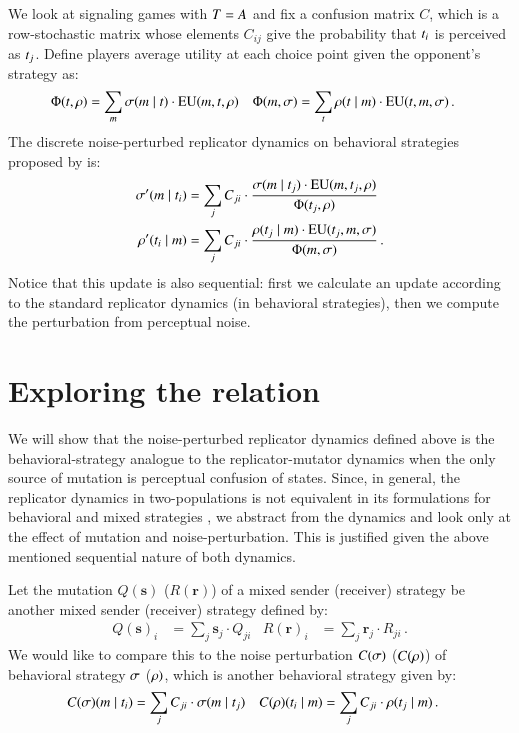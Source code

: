 \documentclass[fleqn,reqno,10pt]{article}
\renewcommand{\Smixed}{\ensuremath{\mathrm{\mathbf{s}}}}
\renewcommand{\Rmixed}{\ensuremath{\mathrm{\mathbf{r}}}}
\begin{document}
We look at signaling games with $T = A$ and fix a confusion
matrix $C$, which is a row-stochastic matrix whose elements $C_{ij}$
give the probability that $t_i$ is perceived as
$t_j$. Define players average utility at each choice point given
the opponent's strategy as:
\begin{align*}
  \Phi(t,\rho) & = \sum_{m} \sigma(m \mid t) \cdot
\mathrm{EU}(m,t,\rho) &
\Phi(m,\sigma) & = \sum_{t} \rho(t \mid m)
\cdot \mathrm{EU}(t,m,\sigma)\,.
\end{align*}
The discrete noise-perturbed replicator dynamics on behavioral
strategies proposed by \citet{Correia2013:The-Bivalent-Tr} is:
\begin{align*}
  \sigma'(m \mid t_i) & = \sum_{j} C_{ji} \cdot
  \frac{\sigma(m \mid t_j) \cdot
    \mathrm{EU}(m,t_j,\rho)} {\Phi(t_j,\rho)} \\
    \rho'(t_i \mid m) & = \sum_{j} C_{ji} \cdot
  \frac{\rho(t_j \mid m) \cdot
    \mathrm{EU}(t_j,m,\sigma)} {\Phi(m,\sigma)}  \,.
\end{align*}
Notice that this update is also sequential: first we calculate an
update according to the standard replicator dynamics (in behavioral
strategies), then we compute the perturbation from perceptual noise.


\section{Exploring the relation}

We will show that the noise-perturbed replicator dynamics defined
above is the behavioral-strategy analogue to the replicator-mutator
dynamics when the only source of mutation is perceptual confusion of
states. Since, in general, the replicator dynamics in two-populations
is not equivalent in its formulations for behavioral and mixed
strategies \citep{Cressman2003:Evolutionary-Dy}, we abstract from the
dynamics and look only at the effect of mutation and
noise-perturbation. This is justified given the above mentioned
sequential nature of both dynamics.

Let the mutation $Q(\Smixed)$ ($R(\Rmixed)$) of a mixed sender
(receiver) strategy be another mixed sender (receiver) strategy
defined by:
\begin{align*}
  Q(\Smixed)_i & =  \sum_j  \Smixed_j \cdot
  Q_{ji} &   R(\Rmixed)_i & =  \sum_{j}  \Rmixed_j \cdot
  R_{ji} \,.
\end{align*}
We would like to compare this to the noise perturbation $C(\sigma)$
($C(\rho)$) of behavioral strategy $\sigma$ ($\rho)$, which is
another behavioral strategy given by:
\begin{align*}
  C(\sigma)(m \mid t_i) & = \sum_{j} C_{ji} \cdot
  \sigma(m \mid t_j) & C(\rho)(t_i \mid
  m) & = \sum_{j} C_{ji} \cdot \rho(t_j \mid m)
  \,.
\end{align*}
\end{document}
